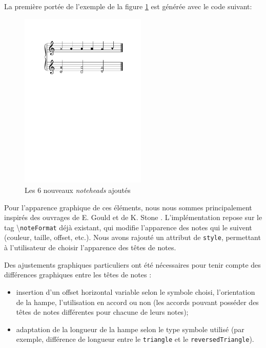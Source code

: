 \documentclass{article}
\newenvironment{gmncode}	{\vspace{-2mm}\small\verbatim}{\endverbatim\vspace{-2mm}}
\newcommand{\code}[1]		{{\small \texttt{#1}}}
\newcommand{\guidotag}[1]	{\textbackslash\code{#1}}
\begin{document}
\vspace{2mm}
La première portée de l'exemple de la figure \ref{fig:noteheads} est générée avec le code suivant:
\begin{gmncode}
[
  \noteFormat<style="x"> a
  \noteFormat<style="diamond"> a
  \noteFormat<style="round"> a
  \noteFormat<style="square"> a
  \noteFormat<style="triangle"> a
  \noteFormat<style="reversedTriangle"> a
]
\end{gmncode}
%
\begin{figure}[h]
\centering
\includegraphics[width=6cm]{img/partitions/noteheads.pdf}
\caption{Les 6 nouveaux \emph{noteheads} ajoutés}
\label{fig:noteheads}
\end{figure}
%
Pour l'apparence graphique de ces éléments, nous nous sommes principalement inspirés des ouvrages de E. Gould \cite{gould2011behind} et de K. Stone \cite{stone1980music}.
L'implémentation repose sur le tag \guidotag{noteFormat} déjà existant, qui modifie l'apparence des notes qui le suivent (couleur, taille, offset, etc.). Nous avons rajouté un attribut de \code{style}, permettant à l'utilisateur de choisir l'apparence des têtes de notes.

Des ajustements graphiques particuliers ont été nécessaires pour tenir compte des différences graphiques entre les têtes de notes :
\begin{itemize}
    \item insertion d'un offset horizontal variable selon le symbole choisi, l'orientation de la hampe, l'utilisation en accord ou non (les accords pouvant posséder des têtes de notes différentes pour chacune de leurs notes);
    \item adaptation de la longueur de la hampe selon le type symbole utilisé (par exemple, différence de longueur entre le \code{triangle} et le \code{reversedTriangle}).
\end{itemize}
\end{document}
